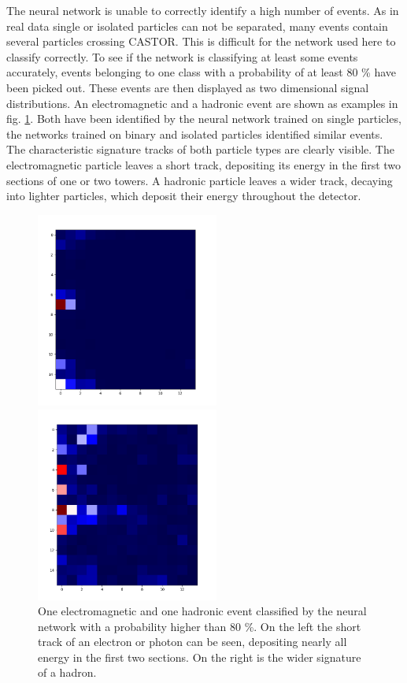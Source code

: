 The neural network is unable to correctly identify a high number of events. As in real data single or isolated particles can not be separated, many events contain several particles crossing CASTOR. This is difficult for the network used here to classify correctly. To see if the network is classifying at least some events accurately, events belonging to one class with a probability of at least 80 \% have been picked out. These events are then displayed as two dimensional signal distributions. An electromagnetic and a hadronic event are shown as examples in fig. \ref{electron}. Both have been identified by the neural network trained on single particles, the networks trained on binary and isolated particles identified similar events. The characteristic signature tracks of both particle types are clearly visible. The electromagnetic particle leaves a short track, depositing its energy in the first two sections of one or two towers. A hadronic particle leaves a wider track, decaying into lighter particles, which deposit their energy throughout the detector.
\begin{figure}
\centering
\begin{minipage}{0.45\textwidth}
\includegraphics[width=6cm]{electron.png}
\end{minipage}
\begin{minipage}{0.45\textwidth}
\includegraphics[width=6cm]{hadron.png}
\end{minipage}
\caption{One electromagnetic and one hadronic event classified by the neural network with a probability higher than 80 \%. On the left the short track of an electron or photon can be seen, depositing nearly all energy in the first two sections. On the right is the wider signature of a hadron.}
\label{electron}
\end{figure}

